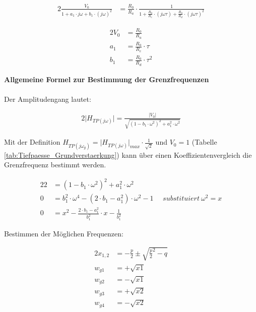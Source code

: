 \begin{alignat}{2}
\frac{V_{0}}{1 + a_{1} \cdot j \omega + b_{1} \cdot \left ( j \omega \right)^2} &= \frac{R_{0}}{R_{a}} \cdot \frac{1}{1+\frac{R_{0}}{R_{e}} \cdot  \left(j \omega \tau \right) + \frac{R_{0}}{R_{d}} \cdot \left ( j \omega \tau \right)^2}
\end{alignat}

\begin{alignat}{2}
V_{0} &= \frac{R_{0}}{R_{a}}\\
a_{1} &= \frac{R_{0}}{R_{e}} \cdot \tau\\
b_{1} &= \frac{R_{0}}{R_{d}} \cdot \tau^2
\end{alignat}

\noindent \textbf{Allgemeine Formel zur Bestimmung der Grenzfrequenzen}\\\\

\noindent Der Amplitudengang lautet:

\begin{alignat}{2}
\lvert H_{TP (j \omega)} \rvert = \frac{\lvert V_{0} \rvert}{\sqrt{\left(1 - b_{1} \cdot \omega^2 \right)^2 + a_{1}^2 \cdot \omega^2}}
\end{alignat}

\noindent Mit der Definition $H_{TP (j \omega_{g})} = \lvert H_{TP (j \omega)} \rvert_{max} \cdot \frac{1}{\sqrt{2}}$ und $V_{0} = 1$ (Tabelle \ref{tab:Tiefpaesse_Grundverstaerkung}) kann über einen Koeffizientenvergleich die Grenzfrequenz bestimmt werden.

\begin{alignat}{2}
2 &= \left(1 - b_{1} \cdot \omega^2 \right)^2 + a_{1}^2 \cdot \omega^2\\
0 &= b_{1}^2 \cdot \omega^4 - (2\cdot b_{1} - a_{1}^2) \cdot \omega^2 - 1~~~~~~substituiert~\omega^2 = x\\
0 &= x^2 - \frac{2 \cdot b_{1} - a_{1}^2}{b_{1}^2} \cdot x - \frac{1}{b_{1}^2}
\end{alignat}

\noindent Bestimmen der Möglichen Frequenzen:

\begin{alignat}{2}
x_{1,2} &= -\frac{p}{2} \pm \sqrt{\frac{p}{2}^2 - q}\\
w_{g1} &= +\sqrt{x1}\\
w_{g2} &= -\sqrt{x1}\\
w_{g3} &= +\sqrt{x2}\\
w_{g4} &= -\sqrt{x2}
\end{alignat}

